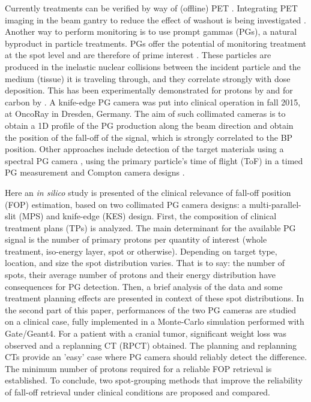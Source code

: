 \documentclass[a4paper,english]{article}
\begin{document}
Currently treatments can be verified by way of (offline) PET \citep{Kraan2015}. Integrating PET imaging in the beam gantry to reduce the effect of washout is being investigated \citep{Sportelli2013}. Another way to perform monitoring is to use prompt gammas (PGs), a natural byproduct in particle treatments. PGs offer the potential of monitoring treatment at the spot level \citep{Smeets2012,Roellinghoff2014a} and are therefore of prime interest \citep{Moteabbed2011,Gueth2013,Golnik2014a,Janssen2014}. These particles are produced in the inelastic nuclear collisions between the incident particle and the medium (tissue) it is traveling through, and they correlate strongly with dose deposition. This has been experimentally demonstrated for protons by \citet{Min2006} and for carbon by \citet{Testa2008}. A knife-edge PG camera \citep{Perali2014,Richter2016} was put into clinical operation in fall 2015, at OncoRay in Dresden, Germany. The aim of such collimated cameras is to obtain a 1D profile of the PG production along the beam direction and obtain the position of the fall-off of the signal, which is strongly correlated to the BP position. Other approaches include detection of the target materials using a spectral PG camera \citep{Verburg2014}, using the primary particle's time of flight (ToF) in a timed PG measurement \citep{Golnik2014a} and Compton camera designs \citep{Roellinghoff2011,Kurosawa2012,Solevi2016,Thirolf2016,Polf2015,Llosa2016}.

Here an \emph{in silico} study is presented of the clinical relevance of fall-off position (FOP) estimation, based on two collimated PG camera designs: a multi-parallel-slit (MPS) and knife-edge (KES) design. First, the composition of clinical treatment plans (TPs) is analyzed. The main determinant for the available PG signal is the number of primary protons per quantity of interest (whole treatment, iso-energy layer, spot or otherwise). Depending on target type, location, and size the spot distribution varies. That is to say: the number of spots, their average number of protons and their energy distribution have consequences for PG detection. Then, a brief analysis of the data and some treatment planning effects are presented in context of these spot distributions. In the second part of this paper, performances of the two PG cameras are studied on a clinical case, fully implemented in a Monte-Carlo simulation performed with Gate/Geant4. For a patient with a cranial tumor, significant weight loss was observed and a replanning CT (RPCT) obtained. The planning and replanning CTs provide an 'easy' case where PG camera should reliably detect the difference. The minimum number of protons required for a reliable FOP retrieval is established. To conclude, two spot-grouping methods that improve the reliability of fall-off retrieval under clinical conditions are proposed and compared.
\end{document}
